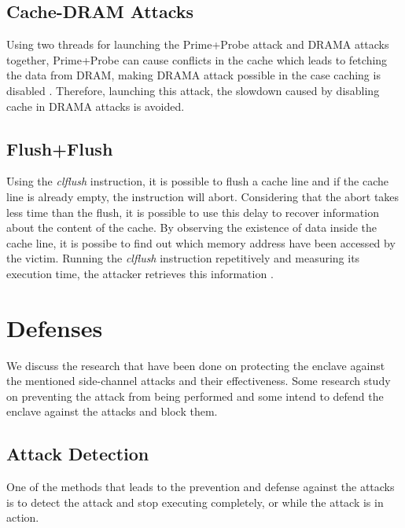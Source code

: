 \subsection{Cache-DRAM Attacks}
Using two threads for launching the Prime+Probe attack \cite{primeprobe1, primeprobe2} and DRAMA attacks \cite{drama} together, Prime+Probe can cause conflicts in the cache which leads to fetching the data from DRAM, making DRAMA attack possible in the case caching is disabled \cite{leakycauldron}. Therefore, launching this attack, the slowdown caused by disabling cache in DRAMA attacks is avoided. 

\subsection{Flush+Flush}
َUsing the \emph{clflush} instruction, it is possible to flush a cache line and if the cache line is already empty, the instruction will abort. Considering that the abort takes less time than the flush, it is possible to use this delay to recover information about the content of the cache. By observing the existence of data inside the cache line, it is possibe to find out which memory address have been accessed by the victim. Running the \emph{clflush} instruction repetitively and measuring its execution time, the attacker retrieves this information \cite{flushflush}.

\section{Defenses}
We discuss the research that have been done on protecting the enclave against the mentioned side-channel attacks and their effectiveness. Some research study on preventing the attack from being performed and some intend to defend the enclave against the attacks and block them.

\subsection{Attack Detection}%
One of the methods that leads to the prevention and defense against the attacks is to detect the attack and stop executing completely, or while the attack is in action.

